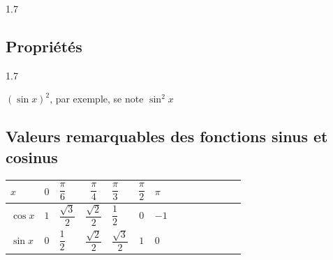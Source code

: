         \begin{spacing}{1.7}
        \begin{bdefis}
            \begin{itemDef}
                \item \pointille[15cm]
                \item \pointille[15cm]
            \end{itemDef}
        \end{bdefis}
    	\end{spacing}
        
    \subsection{Propriétés}
    	\begin{spacing}{1.7}
        \begin{bprops}
            \begin{itemProp}
                \item \pointille[15cm]
                \item \pointille[15cm]
                \item \pointille[15cm]
                \item \pointille[15cm]
                \item \pointille[15cm]
            \end{itemProp}
        \end{bprops}
    	\end{spacing}
        
        \begin{brmq}
            $(\sin x)^2$, par exemple, se note $\sin^2 x$
        \end{brmq}
        
    \subsection{Valeurs remarquables des fonctions sinus et cosinus}
    
        \begin{center}
            \begin{tabular}{ | Xc | Xc | Xc | Xc | Xc | Xc | Xc |}
                 \hline			
                   \rowcolor{NavyBlue!55!white}$x$  & $0$ & $\dfrac{\pi}{6}$ & $\dfrac{\pi}{4}$ & $\dfrac{\pi}{3}$ & $\dfrac{\pi}{2}$ & $\pi$ \\ \hline
                   \rowcolor{NavyBlue!25!white}$\cos x$ & $1$ & $\dfrac{\sqrt 3}{2}$ & $\dfrac{\sqrt 2}{2}$ & $\dfrac{1}{2}$ & $0$ & $-1$ \\ \hline
                   \rowcolor{NavyBlue!25!white}$\sin x$ & $0$ & $\dfrac{1}{2}$ & $\dfrac{\sqrt 2}{2}$ & $\dfrac{\sqrt 3}{2}$ & $1$ & $0$ \\
                 \hline  
            \end{tabular}
        \end{center}
    

